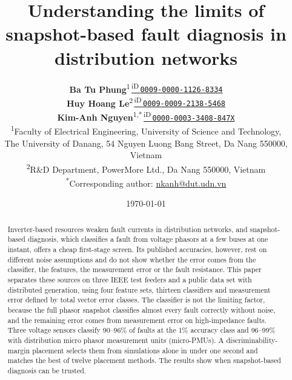 \documentclass[11pt]{article}
\newcommand{\orcidlink}[1]{\href{https://orcid.org/#1}{\textsuperscript{\textsf{iD}}\,\texttt{#1}}}
\begin{document}
\title{Understanding the limits of snapshot-based fault diagnosis in distribution networks}

\author{%
\textbf{Ba Tu Phung}\textsuperscript{1}\,\orcidlink{0009-0000-1126-8334}\\
\textbf{Huy Hoang Le}\textsuperscript{2}\,\orcidlink{0009-0009-2138-5468}\\
\textbf{Kim-Anh Nguyen}\textsuperscript{1,*}\,\orcidlink{0000-0003-3408-847X}\\[7pt]
\normalfont
\small\textsuperscript{1}Faculty of Electrical Engineering, University of Science and Technology,\\
\small The University of Danang, 54 Nguyen Luong Bang Street, Da Nang 550000, Vietnam\\
\small\textsuperscript{2}R\&D Department, PowerMore Ltd., Da Nang 550000, Vietnam\\
\small\textsuperscript{*}Corresponding author: \href{mailto:nkanh@dut.udn.vn}{nkanh@dut.udn.vn}%
}

\date{\today}
\maketitle

\begin{abstract}
Inverter-based resources weaken fault currents in distribution networks, and snapshot-based diagnosis, which classifies a fault from voltage phasors at a few buses at one instant, offers a cheap first-stage screen. Its published accuracies, however, rest on different noise assumptions and do not show whether the error comes from the classifier, the features, the measurement error or the fault resistance. This paper separates these sources on three IEEE test feeders and a public data set with distributed generation, using four feature sets, thirteen classifiers and measurement error defined by total vector error classes. The classifier is not the limiting factor, because the full phasor snapshot classifies almost every fault correctly without noise, and the remaining error comes from measurement error on high-impedance faults. Three voltage sensors classify 90--96\% of faults at the 1\% accuracy class and 96--99\% with distribution micro phasor measurement units (micro-PMUs). A discriminability-margin placement selects them from simulations alone in under one second and matches the best of twelve placement methods. The results show when snapshot-based diagnosis can be trusted.
\end{abstract}
\end{document}
